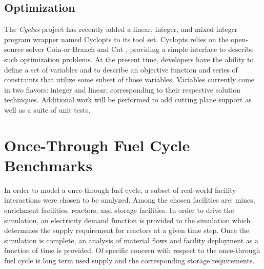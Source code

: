 \documentclass{anstrans}
\begin{document}
\subsection{Optimization}
The \emph{Cyclus} project has recently added a linear, integer, and
mixed integer program wrapper named Cyclopts \cite{cyclopts2012} to
its tool set. Cyclopts relies on the open-source solver Coin-or Branch
and Cut \cite{coinCBC}, providing a simple interface to describe such
optimization problems. At the present time, developers have the
ability to define a set of variables and to describe an objective
function and series of constraints that utilize some subset of those
variables. Variables currently come in two flavors: integer and
linear, corresponding to their respective solution
techniques. Additional work will be performed to add cutting plane
support as well as a suite of unit tests.
\section{Once-Through Fuel Cycle Benchmarks}
In order to model a once-through fuel cycle, a subset of real-world
facility interactions were chosen to be analyzed. Among the chosen
facilities are: mines, enrichment facilities, reactors, and storage
facilities. In order to drive the simulation, an electricity demand
function is provided to the simulation which determines the supply
requirement for reactors at a given time step. Once the simulation is
complete, an analysis of material flows and facility deployment as a
function of time is provided. Of specific concern with respect to the
once-through fuel cycle is long term used supply and the corresponding
storage requirements.
\end{document}
